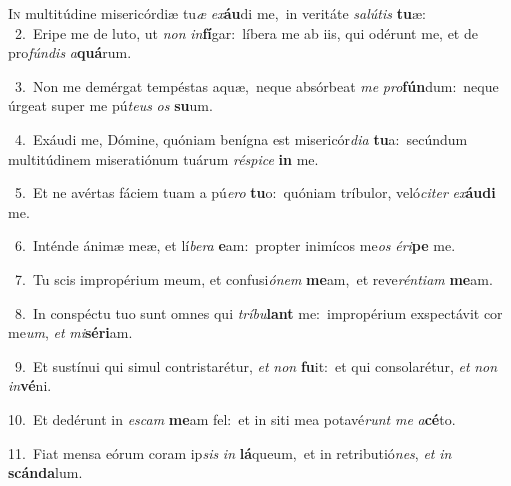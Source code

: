 \lettrine{\initial\textcolor{\initialcolor}{I}}{n} multitúdine misericórdiæ tu\textit{æ} \textit{ex}\-\textbf{áu}di me,~\star in veritáte \textit{sa}\-\textit{lú}\textit{tis} \textbf{tu}\-æ:\\
{\numbfont\textcolor{\numbcolor}{~2.}}~Eripe me de luto, ut \textit{non} \textit{in}\-\textbf{fí}gar:~\star líbera me ab iis, qui odérunt me, et de pro\-\textit{fún}\-\textit{dis} \textit{a}\-\textbf{quá}rum.\par
{\numbfont\textcolor{\numbcolor}{~3.}}~Non me demérgat tempéstas aquæ,~\dagger neque absórbeat \textit{me} \textit{pro}\-\textbf{fún}dum:~\star neque úrgeat super me pú\-\textit{te}\-\textit{us} \textit{os} \textbf{su}\-um.\par
{\numbfont\textcolor{\numbcolor}{~4.}}~Exáudi me, Dómine, quóniam benígna est misericór\-\textit{di}\-\textit{a} \textbf{tu}\-a:~\star secúndum multitúdinem miseratiónum tuárum \textit{ré}\-\textit{spi}\textit{ce} \textbf{in} me.\par
{\numbfont\textcolor{\numbcolor}{~5.}}~Et ne avértas fáciem tuam a pú\-\textit{e}\-\textit{ro} \textbf{tu}\-o:~\star quóniam tríbulor, veló\-\textit{ci}\-\textit{ter} \textit{ex}\-\textbf{áu}\textbf{di} me.\par
{\numbfont\textcolor{\numbcolor}{~6.}}~Inténde ánimæ meæ, et lí\-\textit{be}\-\textit{ra} \textbf{e}\-am:~\star propter inimícos me\textit{os} \textit{é}\-\textit{ri}\textbf{pe} me.\par
{\numbfont\textcolor{\numbcolor}{~7.}}~Tu scis impropérium meum, et confusi\-\textit{ó}\-\textit{nem} \textbf{me}\-am,~\star et reve\-\textit{rén}\-\textit{ti}\textit{am} \textbf{me}\-am.\par
{\numbfont\textcolor{\numbcolor}{~8.}}~In conspéctu tuo sunt omnes qui \textit{trí}\-\textit{bu}\textbf{lant} me:~\star impropérium exspectávit cor me\-\textit{um}\-, \textit{et} \textit{mi}\-\textbf{sé}\textbf{ri}am.\par
{\numbfont\textcolor{\numbcolor}{~9.}}~Et sustínui qui simul contristarétur, \textit{et} \textit{non} \textbf{fu}\-it:~\star et qui consolarétur, \textit{et} \textit{non} \textit{in}\-\textbf{vé}ni.\par
{\numbfont\textcolor{\numbcolor}{10.}}~Et dedérunt in \textit{es}\-\textit{cam} \textbf{me}\-am fel:~\star et in siti mea potavé\textit{runt} \textit{me} \textit{a}\-\textbf{cé}to.\par
{\numbfont\textcolor{\numbcolor}{11.}}~Fiat mensa eórum coram ip\textit{sis} \textit{in} \textbf{lá}\-queum,~\star et in retributió\-\textit{nes}\-, \textit{et} \textit{in} \textbf{scán}\-\textbf{da}lum.\par
